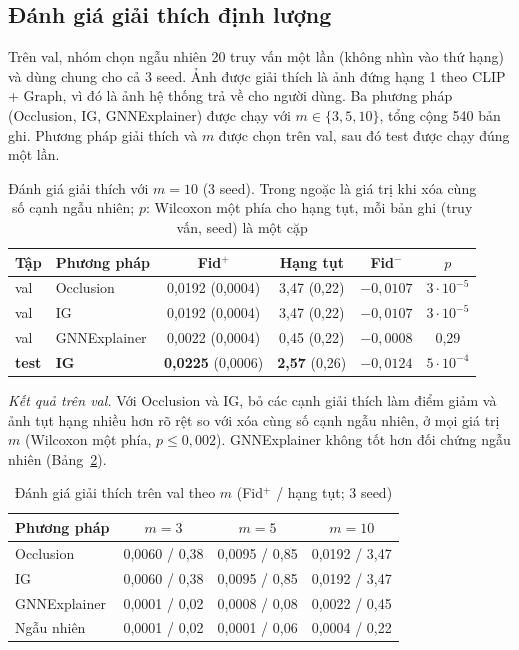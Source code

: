 \subsection{Đánh giá giải thích định lượng}
Trên val, nhóm chọn ngẫu nhiên 20 truy vấn một lần (không nhìn vào thứ hạng) và dùng chung cho cả 3 seed. Ảnh được giải thích là ảnh đứng hạng 1 theo CLIP + Graph, vì đó là ảnh hệ thống trả về cho người dùng. Ba phương pháp (Occlusion, IG, GNNExplainer) được chạy với $m \in \{3, 5, 10\}$, tổng cộng 540 bản ghi. Phương pháp giải thích và $m$ được chọn trên val, sau đó test được chạy đúng một lần.

\begin{table}[t]
\centering
\caption{Đánh giá giải thích với $m = 10$ (3 seed). Trong ngoặc là giá trị khi xóa cùng số cạnh ngẫu nhiên; $p$: Wilcoxon một phía cho hạng tụt, mỗi bản ghi (truy vấn, seed) là một cặp}
\label{tab:xai}
\scriptsize
\setlength{\tabcolsep}{2pt}
\begin{tabular}{@{}l l c c c c@{}}
\toprule
\textbf{Tập} & \textbf{Phương pháp} & \textbf{Fid$^+$} & \textbf{Hạng tụt} & \textbf{Fid$^-$} & $p$ \\
\midrule
val & Occlusion & 0,0192 (0,0004) & 3,47 (0,22) & $-0,0107$ & $3{\cdot}10^{-5}$ \\
val & IG & 0,0192 (0,0004) & 3,47 (0,22) & $-0,0107$ & $3{\cdot}10^{-5}$ \\
val & GNNExplainer & 0,0022 (0,0004) & 0,45 (0,22) & $-0,0008$ & 0,29 \\
\textbf{test} & \textbf{IG} & \textbf{0,0225} (0,0006) & \textbf{2,57} (0,26) & $-0,0124$ & $5{\cdot}10^{-4}$ \\
\bottomrule
\end{tabular}
\end{table}

\textit{Kết quả trên val.} Với Occlusion và IG, bỏ các cạnh giải thích làm điểm giảm và ảnh tụt hạng nhiều hơn rõ rệt so với xóa cùng số cạnh ngẫu nhiên, ở mọi giá trị $m$ (Wilcoxon một phía, $p \le 0,002$). GNNExplainer không tốt hơn đối chứng ngẫu nhiên (Bảng~\ref{tab:xai-m}).

\begin{table}[t]
\centering
\caption{Đánh giá giải thích trên val theo $m$ (Fid$^+$ / hạng tụt; 3 seed)}
\label{tab:xai-m}
\scriptsize
\setlength{\tabcolsep}{2.5pt}
\begin{tabular}{@{}l c c c@{}}
\toprule
\textbf{Phương pháp} & $m = 3$ & $m = 5$ & $m = 10$ \\
\midrule
Occlusion & 0,0060 / 0,38 & 0,0095 / 0,85 & 0,0192 / 3,47 \\
IG & 0,0060 / 0,38 & 0,0095 / 0,85 & 0,0192 / 3,47 \\
GNNExplainer & 0,0001 / 0,02 & 0,0008 / 0,08 & 0,0022 / 0,45 \\
Ngẫu nhiên & 0,0001 / 0,02 & 0,0001 / 0,06 & 0,0004 / 0,22 \\
\bottomrule
\end{tabular}
\end{table}

